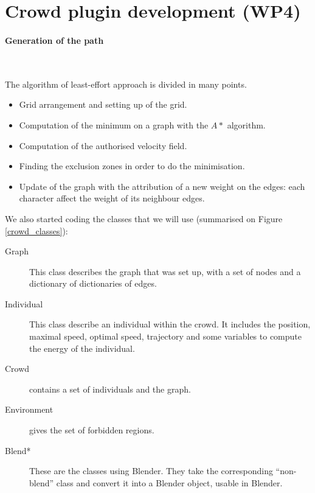 \section{Crowd plugin development (WP4)}

\paragraph{Generation of the path}~

\noindent The algorithm of least-effort approach is divided in many points.
\begin{itemize}
  \item Grid arrangement and setting up of the grid.
  \item Computation of the minimum on a graph with the $A*$ algorithm.
  \item Computation of the authorised velocity field.
  \item Finding the exclusion zones in order to do the minimisation.
  \item Update of the graph with the attribution of a new weight on the edges: each character affect the weight of its neighbour edges.
\end{itemize}


\noindent We also started coding the classes that we will use (summarised on Figure \ref{crowd_classes}):
\begin{description}
  \item[Graph] This class describes the graph that was set up, with a set of nodes and a dictionary of dictionaries of edges.
  \item[Individual] This class describe an individual within the crowd. It includes the position, maximal speed, optimal speed, trajectory and some variables to compute the energy of the individual.
  \item[Crowd] contains a set of individuals and the graph.
  \item[Environment] gives the set of forbidden regions.
  \item[Blend*] These are the classes using Blender. They take the corresponding ``non-blend'' class and convert it into a Blender object, usable in Blender. 
\end{description}


